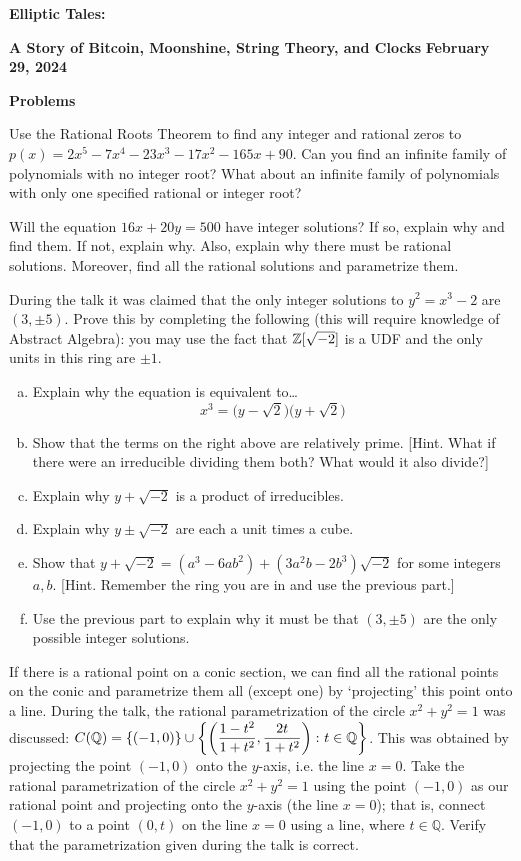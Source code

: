 \documentclass[11pt,letterpaper]{article}
\begin{document}
\begin{center}
{\bfseries\Large Elliptic Tales:} \par 
{\bfseries\large A Story of Bitcoin, Moonshine, String Theory, and Clocks} \pspace
{\bfseries\large February 29, 2024} \par\vspace{0.6cm}
{\large \bfseries Problems}
\end{center} 

\problem Use the Rational Roots Theorem to find any integer and rational zeros to $p(x)= 2x^5 - 7x^4 - 23x^3 - 17x^2 - 165x + 90$. Can you find an infinite family of polynomials with no integer root? What about an infinite family of polynomials with only one specified rational or integer root? \pspace

\problem Will the equation $16x + 20y= 500$ have integer solutions? If so, explain why and find them. If not, explain why. Also, explain why there must be rational solutions. Moreover, find all the rational solutions and parametrize them. \pspace

\problem During the talk it was claimed that the only integer solutions to $y^2= x^3 - 2$ are $(3, \pm 5)$. Prove this by completing the following (this will require knowledge of Abstract Algebra): you may use the fact that $\mathbb{Z}[\sqrt{-2}]$ is a UDF and the only units in this ring are $\pm 1$. 
	\begin{enumerate}[(a)]
	\item Explain why the equation is equivalent to\dots
		\[
		x^3= \big(y - \sqrt{2} \big) \big(y + \sqrt{2} \big)
		\]
	\item Show that the terms on the right above are relatively prime. [Hint. What if there were an irreducible dividing them both? What would it also divide?]
	\item Explain why $y + \sqrt{-2}$ is a product of irreducibles. 
	\item Explain why $y \pm \sqrt{-2}$ are each a unit times a cube. 
	\item Show that $y + \sqrt{-2}= (a^3 - 6ab^2) + (3a^2b - 2b^3) \sqrt{-2}$ for some integers $a, b$. [Hint. Remember the ring you are in and use the previous part.]
	\item Use the previous part to explain why it must be that $(3, \pm 5)$ are the only possible integer solutions. 
	\end{enumerate} \pspace

\problem If there is a rational point on a conic section, we can find all the rational points on the conic and parametrize them all (except one) by `projecting' this point onto a line. During the talk, the rational parametrization of the circle $x^2 + y^2= 1$ was discussed: $C(\mathbb{Q})= \{ (-1,0) \} \cup \left\{ \left(\dfrac{1-t^2}{1+t^2}, \dfrac{2t}{1+t^2} \right) \colon t \in \mathbb{Q} \right\}$. This was obtained by projecting the point $(-1, 0)$ onto the $y$-axis, i.e. the line $x= 0$. Take the rational parametrization of the circle $x^2 + y^2= 1$ using the point $(-1, 0)$ as our rational point and projecting onto the $y$-axis (the line $x= 0$); that is, connect $(-1, 0)$ to a point $(0, t)$ on the line $x= 0$ using a line, where $t \in \mathbb{Q}$. Verify that the parametrization given during the talk is correct. 
\end{document}
